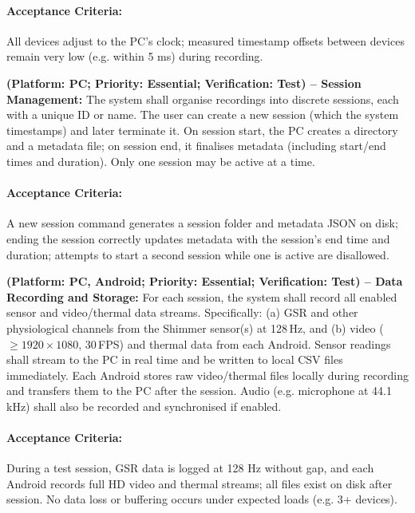 \begin{description}[style=unboxed,leftmargin=0cm]
	      \paragraph{Acceptance Criteria:} All devices adjust to the PC’s clock; measured timestamp offsets between devices remain very low (e.g. within 5 ms) during recording.

	\item[\textbf{FR4}] \textbf{(Platform: PC; Priority: Essential; Verification: Test) – Session Management:} The system shall organise recordings into discrete sessions, each with a unique ID or name. The user can create a new session (which the system timestamps) and later terminate it. On session start, the PC creates a directory and a metadata file; on session end, it finalises metadata (including start/end times and duration). Only one session may be active at a time.

	      \paragraph{Acceptance Criteria:} A new session command generates a session folder and metadata JSON on disk; ending the session correctly updates metadata with the session’s end time and duration; attempts to start a second session while one is active are disallowed.

	\item[\textbf{FR5}] \textbf{(Platform: PC, Android; Priority: Essential; Verification: Test) – Data Recording and Storage:} For each session, the system shall record all enabled sensor and video/thermal data streams. Specifically: (a) GSR and other physiological channels from the Shimmer sensor(s) at 128\,Hz, and (b) video ($\geq 1920 \times 1080$, 30\,FPS) and thermal data from each Android. Sensor readings shall stream to the PC in real time and be written to local CSV files immediately. Each Android stores raw video/thermal files locally during recording and transfers them to the PC after the session. Audio (e.g. microphone at 44.1\,kHz) shall also be recorded and synchronised if enabled.

	      \paragraph{Acceptance Criteria:} During a test session, GSR data is logged at 128 Hz without gap, and each Android records full HD video and thermal streams; all files exist on disk after session. No data loss or buffering occurs under expected loads (e.g. 3+ devices).


\end{description}
